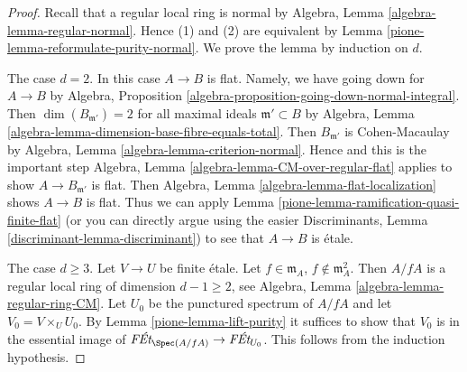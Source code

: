 \begin{proof}

Recall that a regular local ring is normal by
Algebra, Lemma \ref{algebra-lemma-regular-normal}.
Hence (1) and (2) are equivalent by
Lemma \ref{pione-lemma-reformulate-purity-normal}.
We prove the lemma by induction on $d$.

\medskip\noindent
The case $d = 2$. In this case $A \to B$ is flat.
Namely, we have going down for $A \to B$ by
Algebra, Proposition \ref{algebra-proposition-going-down-normal-integral}.
Then $\dim(B_{\mathfrak m'}) = 2$ for all maximal ideals
$\mathfrak m' \subset B$ by
Algebra, Lemma \ref{algebra-lemma-dimension-base-fibre-equals-total}.
Then $B_{\mathfrak m'}$ is Cohen-Macaulay by
Algebra, Lemma \ref{algebra-lemma-criterion-normal}.
Hence and this is the important step
Algebra, Lemma \ref{algebra-lemma-CM-over-regular-flat}
applies to show $A \to B_{\mathfrak m'}$ is flat.
Then Algebra, Lemma \ref{algebra-lemma-flat-localization}
shows $A \to B$ is flat. Thus we can apply
Lemma \ref{pione-lemma-ramification-quasi-finite-flat}
(or you can directly argue using the easier
Discriminants, Lemma \ref{discriminant-lemma-discriminant})
to see that $A \to B$ is \'etale.

\medskip\noindent
The case $d \geq 3$. Let $V \to U$ be finite \'etale.
Let $f \in \mathfrak m_A$, $f \not \in \mathfrak m_A^2$.
Then $A/fA$ is a regular local ring of dimension $d - 1 \geq 2$, see
Algebra, Lemma \ref{algebra-lemma-regular-ring-CM}.
Let $U_0$ be the punctured spectrum of $A/fA$ and let
$V_0 = V \times_U U_0$.
By Lemma \ref{pione-lemma-lift-purity}
it suffices to show that $V_0$ is in the essential
image of $\textit{F\'Et}_{\Spec(A/fA)} \to \textit{F\'Et}_{U_0}$.
This follows from the induction hypothesis.
\end{proof}

